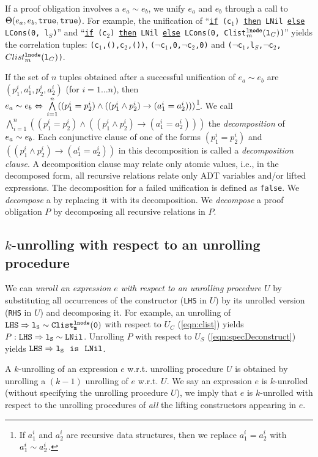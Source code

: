 If a proof obligation involves a \recursiveRelation{}
$e_a\sim{}e_b$, we unify $e_a$ and $e_b$
through a call to $\Theta(e_a, e_b, {\tt true}, {\tt true})$.
For example,
the unification of ``{\tt \underline{if} (c$_1$) \underline{then} LNil \underline{else} LCons(0, l$_S$)}'' and
``{\tt \underline{if} (c$_2$) \underline{then} LNil \underline{else} LCons(0, {\tt Clist$^{{\tt lnode}}_m({\tt l}_C)$})}''
yields the correlation
tuples: {\tt (c$_1$,(),c$_2$,())}, {\tt ($\neg$c$_1$,0,$\neg$c$_2$,0)} and {\tt ($\neg$c$_1$,l$_S$,$\neg$c$_2$,$Clist^{{\tt lnode}}_m({\tt l}_C)$)}.

If the set of $n$ tuples obtained
after a successful unification
of $e_a\sim{}e_b$
are $(p^i_1, a^i_1, p^i_2, a^i_2)$ (for $i=1\ldots{}n$), then
$e_a\sim{}e_b \Leftrightarrow{} \bigwedge\limits_{i=1}^n((p^i_1=p^i_2) \land ((p^i_1\land{}p^i_2)\rightarrow{}(a^i_1=a^i_2)))$\footnote{If $a^i_1$ and $a^i_2$ are recursive data structures, then we replace $a^i_1=a^i_2$ with $a^i_1\sim{}a^i_2$.}.
We call
$\bigwedge\limits_{i=1}^n((p^i_1=p^i_2) \land ((p^i_1\land{}p^i_2)\rightarrow{}(a^i_1=a^i_2)))$
the {\em decomposition}
of $e_a\sim{}e_b$.
Each conjunctive clause of one of the forms $(p^i_1=p^i_2)$ and $((p^i_1\land{}p^i_2)\rightarrow{}(a^i_1=a^i_2))$ in
this decomposition is called a {\em decomposition clause}.
A decomposition clause may relate only atomic values, i.e.,
in the decomposed form, all recursive relations
relate only ADT variables and/or lifted expressions.
The decomposition for a failed unification is defined as {\tt false}.
We {\em decompose}
a \recursiveRelation{} by replacing it with its
decomposition.
We {\em decompose} a proof obligation $P$ by
decomposing all recursive relations in $P$.

\subsection{$k$-unrolling with respect to an unrolling procedure}
We can {\em unroll an expression $e$ with respect to an unrolling
procedure $U$}
by substituting all occurrences
of the constructor ({\tt LHS} in $U$) by its
unrolled version ({\tt RHS} in $U$) and decomposing it.
For example, an unrolling
of ${\tt LHS}\Rightarrow{}{\tt l_S\sim{}Clist^{{\tt lnode}}_{m}(0)}$
with respect to $U_C$ (\cref{eqn:clist})
yields
$P: {\tt LHS}\Rightarrow{}{\tt l_S\sim{}LNil}$.
Unrolling $P$ with respect to $U_S$ (\cref{eqn:specDeconstruct})
yields
${\tt LHS}\Rightarrow{}{\tt l_S\ \ is\ \ LNil}$.

A $k$-unrolling of an expression $e$ w.r.t. unrolling procedure $U$
is obtained by unrolling a $(k-1)$ unrolling of $e$ w.r.t. $U$.
We say an expression $e$ is $k$-unrolled (without specifying
the unrolling procedure $U$), we imply that
$e$ is $k$-unrolled with respect to the unrolling procedures of
{\em all} the lifting constructors appearing in $e$.

